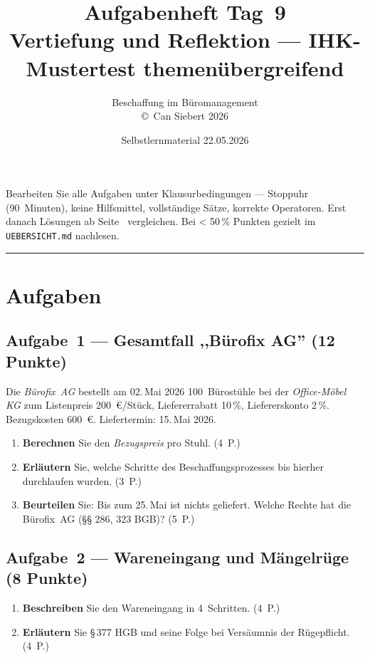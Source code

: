 \documentclass[11pt, a4paper]{article}
\title{\vspace*{-1.5cm}\Huge\bfseries\color{bfwPrimaryDark}Aufgabenheft Tag~9\\[0.4em]
  \large\color{bfwInkSoft}\textnormal{Vertiefung und Reflektion --- IHK-Mustertest themenübergreifend}}
\author{\textsf{Beschaffung im Büromanagement}\\
\textsf{\small\copyright\ Can Siebert\,\textperiodcentered\,2026}}
\date{Selbstlernmaterial \textperiodcentered{} 22.05.2026}
\begin{document}
\maketitle
\thispagestyle{empty}

\begin{merksatz}[title={\bfseries So nutzen Sie diesen Mustertest}]
Bearbeiten Sie alle Aufgaben unter Klausurbedingungen --- Stoppuhr (90~Minuten),
keine Hilfsmittel, vollständige Sätze, korrekte Operatoren. Erst danach Lösungen
ab Seite~\pageref{loesungen} vergleichen. Bei < 50\,\% Punkten gezielt im
\texttt{UEBERSICHT.md} nachlesen.
\end{merksatz}

\tableofcontents
\vspace{1em}
\hrule

\section{Aufgaben}

\subsection*{Aufgabe~1 --- Gesamtfall ,,Bürofix AG'' (12 Punkte)}

Die \emph{Bürofix~AG} bestellt am 02.\,Mai 2026 100~Bürostühle bei der
\emph{Office-Möbel KG} zum Listenpreis 200~€/Stück, Liefererrabatt 10\,\%,
Liefererskonto 2\,\%. Bezugskosten 600~€. Liefertermin: 15.\,Mai 2026.

\begin{enumerate}[label=(\alph*)]
  \item \textbf{Berechnen} Sie den \emph{Bezugspreis} pro Stuhl. \hfill (4~P.)
  \item \textbf{Erläutern} Sie, welche Schritte des Beschaffungsprozesses bis hierher durchlaufen wurden. \hfill (3~P.)
  \item \textbf{Beurteilen} Sie: Bis zum 25.\,Mai ist nichts geliefert. Welche Rechte hat die Bürofix~AG (§§ 286, 323 BGB)? \hfill (5~P.)
\end{enumerate}

\subsection*{Aufgabe~2 --- Wareneingang und Mängelrüge (8 Punkte)}

\begin{enumerate}[label=(\alph*)]
  \item \textbf{Beschreiben} Sie den Wareneingang in 4~Schritten. \hfill (4~P.)
  \item \textbf{Erläutern} Sie §\,377 HGB und seine Folge bei Versäumnis der Rügepflicht. \hfill (4~P.)
\end{enumerate}
\end{document}
